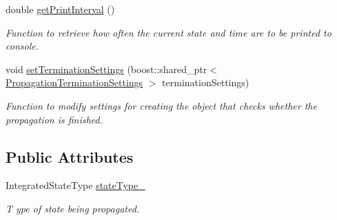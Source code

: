 \begin{DoxyCompactItemize}
double \hyperlink{classtudat_1_1propagators_1_1PropagatorSettings_a283ece0684174a4aff3d34df60f062a1}{get\+Print\+Interval} ()
\begin{DoxyCompactList}\small\item\em Function to retrieve how often the current state and time are to be printed to console. \end{DoxyCompactList}\item 
void \hyperlink{classtudat_1_1propagators_1_1PropagatorSettings_ad7ec7e935fbdb5f211eb624d14234f5c}{set\+Termination\+Settings} (boost\+::shared\+\_\+ptr$<$ \hyperlink{classtudat_1_1propagators_1_1PropagationTerminationSettings}{Propagation\+Termination\+Settings} $>$ termination\+Settings)
\begin{DoxyCompactList}\small\item\em Function to modify settings for creating the object that checks whether the propagation is finished. \end{DoxyCompactList}\end{DoxyCompactItemize}
\subsection*{Public Attributes}
\begin{DoxyCompactItemize}
\item 
Integrated\+State\+Type \hyperlink{classtudat_1_1propagators_1_1PropagatorSettings_adc6ec246092e6428117bc630fa2a84e7}{state\+Type\+\_\+}\hypertarget{classtudat_1_1propagators_1_1PropagatorSettings_adc6ec246092e6428117bc630fa2a84e7}{}\label{classtudat_1_1propagators_1_1PropagatorSettings_adc6ec246092e6428117bc630fa2a84e7}

\begin{DoxyCompactList}\small\item\em T ype of state being propagated. \end{DoxyCompactList}\end{DoxyCompactItemize}
